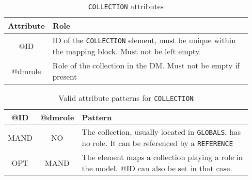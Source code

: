 
\begin{table}[!htbp]
\small
\centering
\begin{tabulary}{\linewidth}{|c|J|}       
       \hline 
            \textbf{Attribute} & 
            \textbf {Role}\\
       \hline         \hline  
            @ID & 
            ID of the \texttt{COLLECTION} element, must be unique within the mapping block. Must not be left empty.\\
        \hline 
            @dmrole & 
            Role of the collection in the DM. Must not be empty if present \\
        \hline 
     \end{tabulary}
     \caption{\texttt{COLLECTION} attributes} 
     \label{tbl:collection-att}
 \end{table}



\begin{table}[!htbp]
\small
\centering
\begin{tabulary}{\linewidth}{|c|c|J|}
    \hline 
        \textbf{@ID} &
        \textbf{@dmrole} &
        \textbf{Pattern}\\
    \hline      \hline  
        MAND &           
        NO &           
        The collection, usually located in \texttt{GLOBALS}, has no role. It can be referenced by a \texttt{REFERENCE}  \\
    \hline   
        OPT &           
        MAND &           
        The element maps a collection playing a role in the model. @ID can also be set in that case. \\
   \hline 
\end{tabulary}
     \caption{Valid attribute patterns for  \texttt{COLLECTION}} 
     \label{tbl:collection-pattern}
 \end{table}



